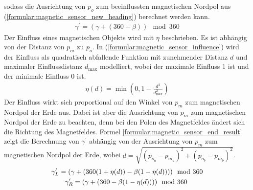 sodass die Ausrichtung von $p_{o}$ zum beeinflussten magnetischen Nordpol aus (\ref{formular:magnetic_sensor_new_heading}) berechnet werden kann.
\begin{align}
    \label{formular:magnetic_sensor_new_heading}
    \gamma^{\prime} = (\gamma + (360 - \beta))\mod 360
\end{align}
\newline
\newline
Der Einfluss eines magnetischen Objekts wird mit $\eta$ beschrieben.
Es ist abhängig von der Distanz von $p_{m}$ zu $p_{o}$.
In (\ref{formular:magnetic_sensor_influence}) wird der Einfluss als quadratisch abfallende Funktion mit zunehmender Distanz $d$ und maximaler Einflussdistanz $d_{\max}$ modelliert,
wobei der maximale Einfluss 1 ist und der minimale Einfluss 0 ist.
\begin{align}
    \label{formular:magnetic_sensor_influence}
    \eta(d) = \min(0, 1 - \frac{d^2}{d_{\max}^2})
\end{align}
Der Einfluss wirkt sich proportional auf den Winkel von $p_{m}$ zum magnetischen Nordpol der Erde aus.
Dabei ist aber die Ausrichtung von $p_{m}$ zum magnetischen Nordpol der Erde zu beachten, denn bei den Polen des Magnetfeldes ändert sich die Richtung des Magnetfeldes.
Formel \ref{formular:magnetic_sensor_end_result} zeigt die Berechnung von $\gamma^{\prime}$ abhängig von der Ausrichtung von $p_{m}$ zum magnetischen Nordpol der Erde,
wobei $d = \sqrt{(p_{o_a} - p_{m_a})^2 + (p_{o_b} - p_{m_b})^2}$.
\begin{align}
    \label{formular:magnetic_sensor_end_result}
    \gamma^{\prime}_L = (\gamma + (360(1 + \eta(d)) - \beta(1 - \eta(d))))\mod 360 \\\nonumber
    \gamma^{\prime}_R = (\gamma + (360 - \beta(1 - \eta(d))))\mod 360 \hspace{0.8cm}
\end{align}

